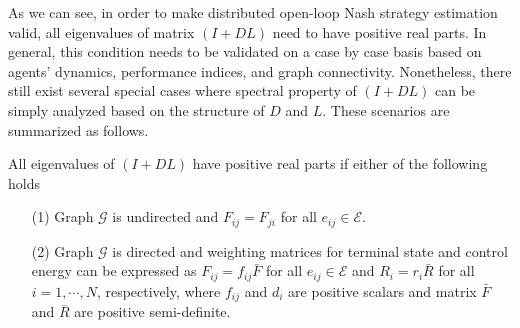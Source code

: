 \documentclass[12pt,draftcls,onecolumn]{IEEEtran}  %
\begin{document}
As we can see, in order to make distributed open-loop Nash strategy estimation valid, all eigenvalues of matrix $(I+DL)$ need to have positive real parts. In general, this condition needs to be validated on a case by case basis based on agents' dynamics, performance indices, and graph connectivity. Nonetheless, there still exist several special cases where
spectral property of $(I+DL)$ can be simply analyzed based on the structure of $D$ and $L$. These scenarios are summarized as follows.
\begin{Pro}
All eigenvalues of $(I+DL)$ have positive real parts if either of the following holds
\begin{itemize}
\item[(1)] Graph $\mathcal{G}$ is undirected and $F_{ij}=F_{ji}$ for all $e_{ij}\in\mathcal{E}$. 
\item[(2)] Graph $\mathcal{G}$ is directed and weighting matrices for terminal state and control energy can be expressed as $F_{ij}=f_{ij}\bar{F}$ for all $e_{ij}\in\mathcal{E}$ and $R_i=r_i\bar{R}$ for all $i=1,\cdots,N$, respectively, where $f_{ij}$ and $d_i$ are positive scalars and matrix $\bar{F}$ and $\bar{R}$ are positive semi-definite.  
\end{itemize} 
\end{Pro}
\end{document}
